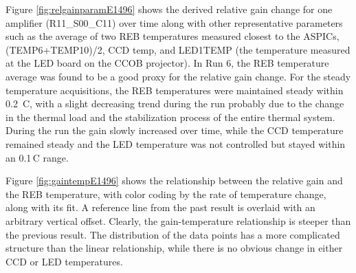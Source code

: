 Figure \ref{fig:relgainparamE1496} shows the derived 
 relative gain change for one amplifier (R11\_S00\_C11) over time along with other representative parameters such as the average of two REB temperatures measured closest to the ASPICs, (TEMP6+TEMP10)/2, CCD temp, and LED1TEMP (the temperature measured at the LED board on the CCOB projector). In Run 6, the REB temperature average was found to be a good proxy for the relative gain change.
 For the steady temperature acquisitions, the REB temperatures were maintained steady within 0.2\, C, with a slight decreasing trend during the run probably due to the change in the thermal load and the stabilization process of the entire thermal system.
During the run the gain slowly increased over time, while the CCD temperature remained steady and the LED temperature was not controlled but stayed within an 0.1\,C range.

 Figure \ref{fig:gaintempE1496} shows the relationship between the relative gain and the REB temperature, with color coding by the rate of temperature change, along with its fit. A reference line from the past result is overlaid with an arbitrary vertical offset. Clearly, the gain-temperature relationship is steeper than the previous result. The distribution of the data points has a more complicated structure than the linear relationship, while there is no obvious change in either CCD or LED temperatures. 



